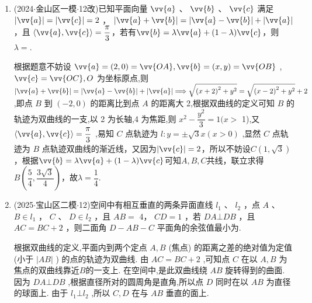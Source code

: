 \begin{enumerate}
\begin{jieda}
        \ps 设$a_n = a$，迭代可知$\left\{\begin{array}{l}
            b_{n+2} = b_n + \dfrac{a}{2} \\
            c_{n+2} = c_n + \dfrac{a}{2}
        \end{array}\right.$，故易知$\left\{  {S}_{{2n} - 1}\right\}$ 为严格增数列, $\left\{  {S}_{2n}\right\}$ 为严格增数列，结合选项可知选B.
    \end{jieda}

    \item (2024$\cdot$金山区一模$\cdot$12改)已知平面向量 $\vv{a}$ 、 $\vv{b}$ 、 $\vv{c}$ 满足 $\left| \vv{a}\right| = |\vv{c}| = 2$ ， $\left| {\vv{a} + \vv{b}}\right|  = \left| {\vv{a} - \vv{b}}\right|  + \left| \vv{a}\right|$ ，且 $\langle \vv{a},\vv{c}\rangle  = \dfrac{\pi }{3}$，若有$\vv{b} = \lambda \vv{a} + (1-\lambda)\vv{c}$，则 $\lambda = $.
    \begin{jieda}
        根据题意不妨设 $\vv{a} = \left( {2,0}\right)  = \vv{OA},\vv{b} = \left( {x,y}\right)  = \vv{OB}$ , $\vv{c} = \vv{OC},O$ 为坐标原点,则 $\left| {\vv{a} + \vv{b}}\right|  = \left| {\vv{a} - \vv{b}}\right|  + \left| \vv{a}\right|  \Longrightarrow  \sqrt{{\left( x + 2\right) }^{2} + {y}^{2}} = \sqrt{{\left( x - 2\right) }^{2} + {y}^{2}} + 2$ ,即点 $B$ 到 $\left( {-2,0}\right)$ 的距离比到点 $A$ 的距离大 2,根据双曲线的定义可知 $B$ 的轨迹为双曲线的一支,以 2 为长轴,4 为焦距,则 ${x}^{2} - \dfrac{{y}^{2}}{3} = 1(x >$ 1),又 $\langle \vv{a},\vv{c}\rangle  = \dfrac{\pi }{3}$ ,易知 $C$ 点轨迹为 $l : y =  \pm  \sqrt{3}x\left( {x > 0}\right)$ ,显然 $C$ 点轨迹为 $B$ 点轨迹双曲线的渐近线，又因为$|\vv{c}| = 2$，所以不妨设$C(1, \sqrt{3})$，根据$\vv{b} = \lambda \vv{a} + (1-\lambda)\vv{c}$可知$A, B, C$共线，联立求得$B\left(\dfrac{5}{4}, \dfrac{3\sqrt{3}}{4}\right)$，故$\lambda = \dfrac{1}{4}$.
    \end{jieda}

    \item (2025$\cdot$宝山区二模$\cdot$12)空间中有相互垂直的两条异面直线 ${l}_{1}$ 、 ${l}_{2}$ ，点 $A$ 、 $B \in  {l}_{1}$ ， $C$ 、 $D \in  {l}_{2}$ ，且 ${AB} =$ 4， ${CD} = 1$ ，若 ${DA}\bot {DB}$ ，且 ${AC} = {BC} + 2$ ，则二面角 $D - {AB} - C$ 平面角的余弦值最小为.
    \begin{jieda}
        根据双曲线的定义,平面内到两个定点 $A,B$ (焦点) 的距离之差的绝对值为定值 (小于 $\left| {AB}\right|$ ) 的点的轨迹为双曲线. 由 ${AC} = {BC} + 2$ ,可知点 $C$ 在以 $A,B$ 为焦点的双曲线靠近$B$的一支上. 在空间中,是此双曲线绕 ${AB}$ 旋转得到的曲面. 因为 ${DA} \bot  {DB}$ ,根据直径所对的圆周角是直角,所以点 $D$ 同时在以 ${AB}$ 为直径的球面上. 由于 ${l}_{1} \bot  {l}_{2}$ ,所以 $C,D$ 在与 ${AB}$ 垂直的面上. 
        

\end{jieda}
\end{enumerate}
